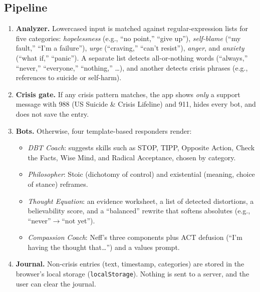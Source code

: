 \documentclass[11pt]{article}
\begin{document}
\subsection{Pipeline}
\begin{enumerate}
\item \textbf{Analyzer.} Lowercased input is matched against regular-expression lists for five categories: \emph{hopelessness} (e.g., ``no point,'' ``give up''), \emph{self-blame} (``my fault,'' ``I'm a failure''), \emph{urge} (``craving,'' ``can't resist''), \emph{anger}, and \emph{anxiety} (``what if,'' ``panic''). A separate list detects all-or-nothing words (``always,'' ``never,'' ``everyone,'' ``nothing,'' \ldots), and another detects crisis phrases (e.g., references to suicide or self-harm).
\item \textbf{Crisis gate.} If any crisis pattern matches, the app shows \emph{only} a support message with 988 (US Suicide \& Crisis Lifeline) and 911, hides every bot, and does not save the entry.
\item \textbf{Bots.} Otherwise, four template-based responders render:
 \begin{itemize}
 \item \emph{DBT Coach}: suggests skills such as STOP, TIPP, Opposite Action, Check the Facts, Wise Mind, and Radical Acceptance, chosen by category.
 \item \emph{Philosopher}: Stoic (dichotomy of control) and existential (meaning, choice of stance) reframes.
 \item \emph{Thought Equation}: an evidence worksheet, a list of detected distortions, a believability score, and a ``balanced'' rewrite that softens absolutes (e.g., ``never''$\to$``not yet'').
 \item \emph{Compassion Coach}: Neff's three components plus ACT defusion (``I'm having the thought that\ldots'') and a values prompt.
 \end{itemize}
\item \textbf{Journal.} Non-crisis entries (text, timestamp, categories) are stored in the browser's local storage (\texttt{localStorage}). Nothing is sent to a server, and the user can clear the journal.
\end{enumerate}
\end{document}
